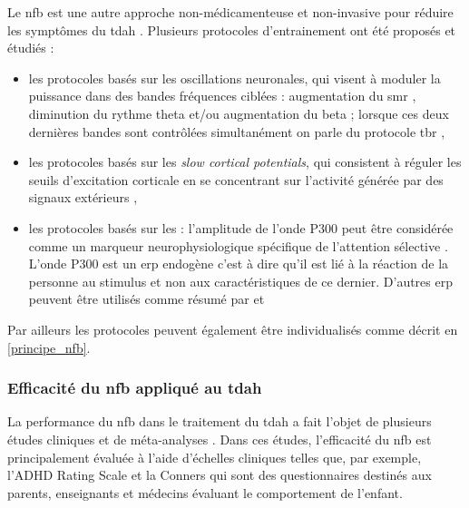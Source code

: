 Le \gls{nfb} est une autre approche non-médicamenteuse et non-invasive pour réduire les symptômes du \gls{tdah} \citep{Arns2015, Marzbani2016}.  
Plusieurs protocoles d'entrainement ont été proposés et étudiés :
\begin{itemize}
\item les protocoles basés sur les oscillations neuronales, qui visent à moduler la puissance dans des bandes fréquences ciblées : augmentation du 
\gls{smr} \citep{Beauregard2006}, diminution du rythme theta et/ou augmentation du beta \citep{Arns2015, Kropotov2005} ; lorsque ces deux dernières 
bandes sont contrôlées simultanément on parle du protocole \gls{tbr} \citep{Lubar1976, Arns2013}, 
\item les protocoles basés sur les \textit{slow cortical potentials}, qui consistent à réguler les seuils d'excitation corticale en se concentrant sur l'activité 
générée par des signaux extérieurs \citep{Heinrich2004, Banaschewski2007},
\item les protocoles basés sur les  : l'amplitude de l'onde P300 peut être considérée comme un marqueur neurophysiologique spécifique de l'attention 
sélective \citep{Desain2012, Fouillen2017}. L'onde P300 est un \gls{erp} endogène c'est à dire qu'il est lié à la réaction de la personne au stimulus et non aux 
caractéristiques de ce dernier. D'autres \gls{erp} peuvent être utilisés comme résumé par \citet{Johnstone2013} et \citet{Barry2003erp}
\end{itemize}

Par ailleurs les protocoles peuvent également être individualisés comme décrit en \ref{principe_nfb}.

\subsubsection{Efficacité du \gls{nfb} appliqué au \gls{tdah}}

La performance du \gls{nfb} dans le traitement du \gls{tdah} a fait l'objet de plusieurs études cliniques \citep{Escolano2014, Maurizio2014, Strehl2017} 
et de méta-analyses \citep{Arns2009, Arns2013, Sonuga-Barke2013, Micoulaud2014, Cortese2016, Catala2017, Lambez2019}. Dans ces études, l'efficacité du \gls{nfb} est 
principalement évaluée à l'aide d'échelles cliniques telles que, par exemple, l'ADHD Rating Scale \citep{Pappas2006} et la Conners \citep{Conners2008} qui sont 
des questionnaires destinés aux parents, enseignants et médecins évaluant le comportement de l'enfant. 

